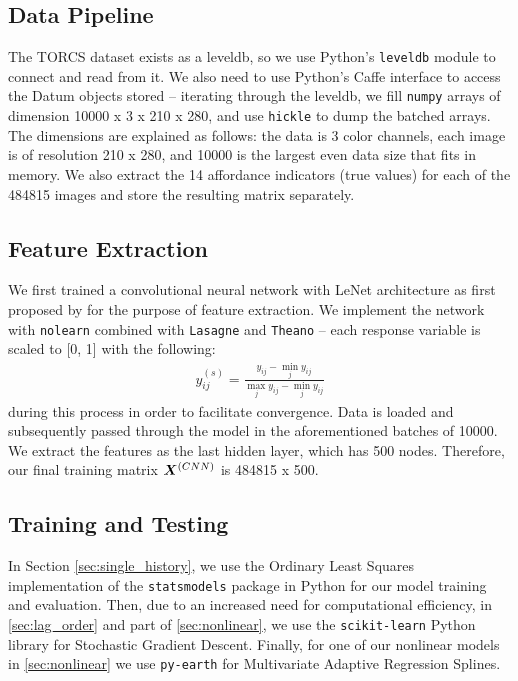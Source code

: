 \documentclass[11pt]{article}
\begin{document}
\subsection{Data Pipeline}
The TORCS dataset exists as a leveldb, so we use Python's \lstinline{leveldb} module to connect and read from it. We also need to use Python's Caffe interface to access the Datum objects stored -- iterating through the leveldb, we fill \lstinline{numpy} arrays of dimension 10000 x 3 x 210 x 280, and use \lstinline{hickle} to dump the batched arrays. The dimensions are explained as follows: the data is 3 color channels, each image is of resolution 210 x 280, and 10000 is the largest even data size that fits in memory. We also extract the 14 affordance indicators (true values) for each of the 484815 images and store the resulting matrix separately.
\subsection{Feature Extraction}
We first trained a convolutional neural network with LeNet architecture as first proposed by \cite{lenet} for the purpose of feature extraction.  We implement the network with \lstinline{nolearn} combined with \lstinline{Lasagne} and \lstinline{Theano} -- each response variable is scaled to [0, 1] with the following:
\begin{align*}
y_{ij}^{(s)} = \frac{y_{ij} - \min_jy_{ij}}{\max_jy_{ij} - \min_jy_{ij}}
\end{align*}
during this process in order to facilitate convergence.  Data is loaded and subsequently passed through the model in the aforementioned batches of 10000.  We extract the features as the last hidden layer, which has 500 nodes.  Therefore, our final training matrix $\bm{X}^{(CNN)}$ is 484815 x 500.
\subsection{Training and Testing}
In Section \ref{sec:single_history}, we use the Ordinary Least Squares implementation of the \lstinline{statsmodels} package in Python for our model training and evaluation.  Then, due to an increased need for computational efficiency, in \ref{sec:lag_order} and part of \ref{sec:nonlinear}, we use the \lstinline{scikit-learn} Python library for Stochastic Gradient Descent.  Finally, for one of our nonlinear models in \ref{sec:nonlinear} we use \lstinline{py-earth} for Multivariate Adaptive Regression Splines.
\end{document}
